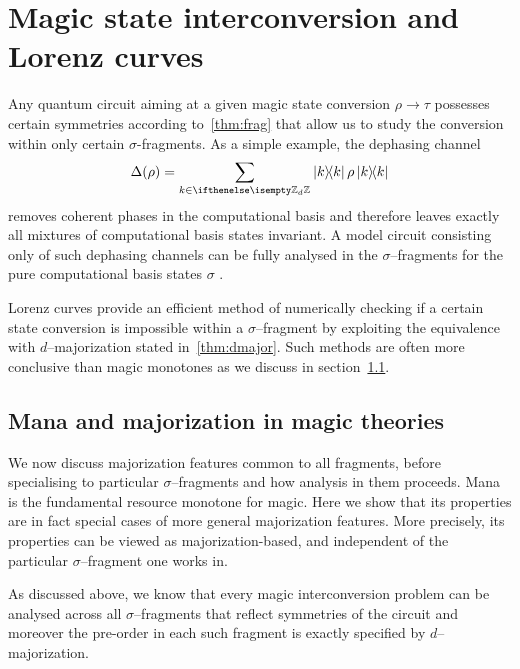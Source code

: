 \documentclass[pra,
aps,
twocolumn,
superscriptaddress,
groupedaddress,
nofootinbib,
reprint
]{revtex4-1}
\begin{document}
 


\section{Magic state interconversion and Lorenz curves}
\label{sec:distill}

Any quantum circuit aiming at a given magic state conversion $\rho \longrightarrow \tau$ possesses certain symmetries according to~\cref{thm:frag} that allow us to study the conversion within only certain $\sigma$-fragments.
As a simple example, the dephasing channel
\begin{equation}\label{eq:dephase}
	\Delta(\rho) = \sum_{k \in \zd} \ketbra{k}{k}\rho\ketbra{k}{k}
\end{equation}
removes coherent phases in the computational basis and therefore leaves exactly all mixtures of computational basis states invariant.
A model circuit consisting only of such dephasing channels can be fully analysed in the $\sigma$--fragments for the pure computational basis states $\sigma$ .

Lorenz curves provide an efficient method of numerically checking if a certain state conversion is impossible within a $\sigma$--fragment by exploiting the equivalence with $d$--majorization stated in~\cref{thm:dmajor}.
Such methods are often more conclusive than magic monotones as we discuss in section~\cref{sec:scmana}.

\subsection{Mana and majorization in magic theories}\label{sec:scmana}
We now discuss majorization features common to all fragments, before specialising to particular $\sigma$--fragments and how analysis in them proceeds. 
Mana is the fundamental resource monotone for magic. 
Here we show that its properties are in fact special cases of more general majorization features. 
More precisely, its properties can be viewed as majorization-based, and independent of the particular $\sigma$--fragment one works in.

As discussed above, we know that every magic interconversion problem can be analysed across all $\sigma$--fragments that reflect symmetries of the circuit and moreover the pre-order in each such fragment is exactly specified by $d$--majorization.
\end{document}
